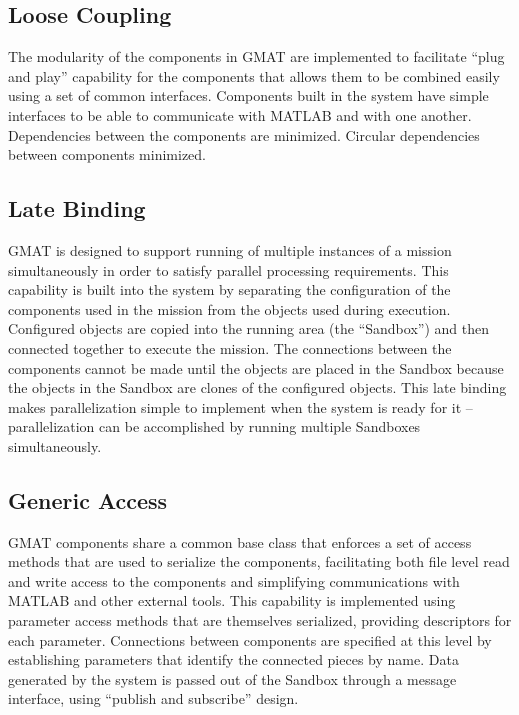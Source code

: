 \subsection{Loose Coupling}

The modularity of the components in GMAT are implemented to facilitate ``plug and play'' capability
for the components that allows them to be combined easily using a set of common interfaces.
Components built in the system have simple interfaces to be able to communicate with MATLAB and with
one another.  Dependencies between the components are minimized.  Circular dependencies between
components minimized.

\subsection{Late Binding}

GMAT is designed to support running of multiple instances of a mission simultaneously in order to
satisfy parallel processing requirements.  This capability is built into the system by separating
the configuration of the components used in the mission from the objects used during execution.
Configured objects are copied into the running area (the ``Sandbox'') and then connected together to
execute the mission.  The connections between the components cannot be made until the objects are
placed in the Sandbox because the objects in the Sandbox are clones of the configured objects.  This
late binding makes parallelization simple to implement when the system is ready for it --
parallelization can be accomplished by running multiple Sandboxes simultaneously.

\subsection{Generic Access}

GMAT components share a common base class that enforces a set of access methods that are used to
serialize the components, facilitating both file level read and write access to the components and
simplifying communications with MATLAB and other external tools.  This capability is implemented
using parameter access methods that are themselves serialized, providing descriptors for each
parameter.  Connections between components are specified at this level by establishing parameters
that identify the connected pieces by name.  Data generated by the system is passed out of the
Sandbox through a message interface, using ``publish and subscribe'' design.

